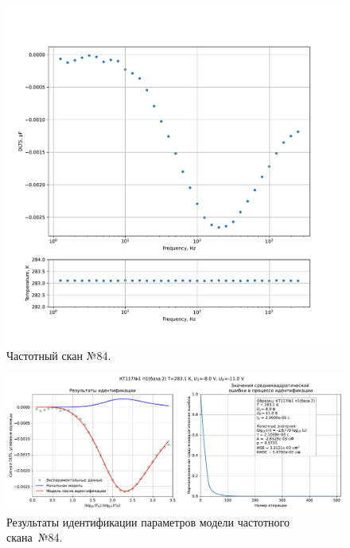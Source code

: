 \begin{figure}[!ht]
    \centering
    \includegraphics[width=1\textwidth]{../plots/КТ117№1_п1(база 2)_2500Гц-1Гц_1пФ_+10С_-8В-11В_50мВ_20мкс_шаг_0,1.pdf}
    \caption{Частотный скан №84.}
    \label{pic:frequency_scan_84}
\end{figure}

\begin{figure}[!ht]
    \centering
    \includegraphics[width=1\textwidth]{../plots/КТ117№1_п1(база 2)_2500Гц-1Гц_1пФ_+10С_-8В-11В_50мВ_20мкс_шаг_0,1_model.pdf}
    \caption{Результаты идентификации параметров модели частотного скана~№84.}
    \label{pic:frequency_scan_model84}
\end{figure}

\pagebreak


